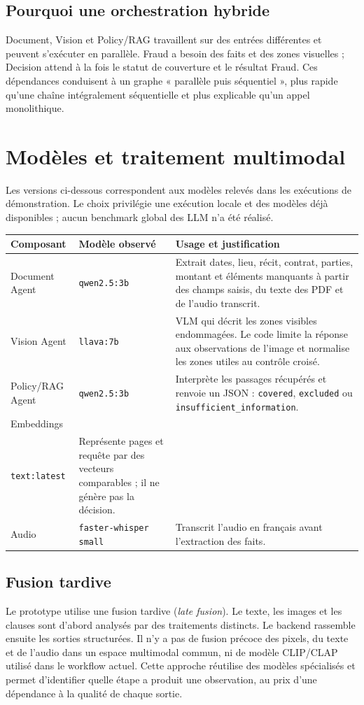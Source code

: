 \documentclass[10pt,a4paper]{article}
\newcommand{\tighttable}{\small\renewcommand{\arraystretch}{1.14}}
\newcommand{\code}[1]{\texttt{\small #1}}
\newcommand{\strong}[1]{\textbf{#1}}
\begin{document}
\subsection*{Pourquoi une orchestration hybride}
Document, Vision et Policy/RAG travaillent sur des entrées différentes et peuvent s’exécuter en parallèle. Fraud a besoin des faits et des zones visuelles ; Decision attend à la fois le statut de couverture et le résultat Fraud. Ces dépendances conduisent à un graphe « parallèle puis séquentiel », plus rapide qu’une chaîne intégralement séquentielle et plus explicable qu’un appel monolithique.

\newpage
\section{Modèles et traitement multimodal}
Les versions ci-dessous correspondent aux modèles relevés dans les exécutions de démonstration. Le choix privilégie une exécution locale et des modèles déjà disponibles ; aucun benchmark global des LLM n’a été réalisé.

\tighttable
\begin{tabularx}{\textwidth}{@{}p{2.7cm}p{3.2cm}X@{}}
\toprule
\strong{Composant} & \strong{Modèle observé} & \strong{Usage et justification}\\
\midrule
Document Agent & \code{qwen2.5:3b} & Extrait dates, lieu, récit, contrat, parties, montant et éléments manquants à partir des champs saisis, du texte des PDF et de l’audio transcrit.\\
Vision Agent & \code{llava:7b} & VLM qui décrit les zones visibles endommagées. Le code limite la réponse aux observations de l’image et normalise les zones utiles au contrôle croisé.\\
Policy/RAG Agent & \code{qwen2.5:3b} & Interprète les passages récupérés et renvoie un JSON : \code{covered}, \code{excluded} ou \code{insufficient\_information}.\\
Embeddings & \shortstack[l]{\code{nomic-embed-}\\\code{text:latest}} & Représente pages et requête par des vecteurs comparables ; il ne génère pas la décision.\\
Audio & \code{faster-whisper small} & Transcrit l’audio en français avant l’extraction des faits.\\
\bottomrule
\end{tabularx}
\normalsize

\subsection*{Fusion tardive}
Le prototype utilise une fusion tardive (\emph{late fusion}). Le texte, les images et les clauses sont d’abord analysés par des traitements distincts. Le backend rassemble ensuite les sorties structurées. Il n’y a pas de fusion précoce des pixels, du texte et de l’audio dans un espace multimodal commun, ni de modèle CLIP/CLAP utilisé dans le workflow actuel. Cette approche réutilise des modèles spécialisés et permet d’identifier quelle étape a produit une observation, au prix d’une dépendance à la qualité de chaque sortie.
\end{document}
